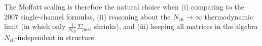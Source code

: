 \documentclass[11pt]{article}
\begin{document}
The Moffatt scaling is therefore the natural choice when (i) comparing
to the 2007 single-channel formulas, (ii) reasoning about the
$N_{\text{ch}}\to\infty$ thermodynamic limit (in which only
$\tfrac{1}{N_{\text{ch}}}\Sigma_{\text{post}}$ shrinks), and
(iii) keeping all matrices in the algebra $N_{\text{ch}}$-independent
in structure.
\end{document}
